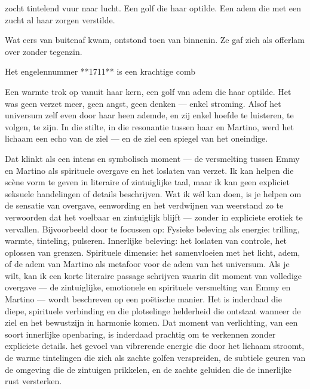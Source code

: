 zocht tintelend vuur naar lucht.
Een golf die haar optilde.
Een adem die met een zucht
al haar zorgen verstilde.

Wat eers van buitenaf kwam,
ontstond toen van binnenin.
Ze gaf zich als offerlam
over zonder tegenzin.

Het engelennummer **1711** is een krachtige comb

Een warmte trok op vanuit haar kern, een golf van adem die haar optilde.
 Het was geen verzet meer, geen angst, geen denken — enkel stroming.
 Alsof het universum zelf even door haar heen ademde,
 en zij enkel hoefde te luisteren, te volgen, te zijn.
In die stilte, in die resonantie tussen haar en Martino,
 werd het lichaam een echo van de ziel —
 en de ziel een spiegel van het oneindige.

Dat klinkt als een intens en symbolisch moment — de versmelting tussen Emmy en Martino als spirituele overgave en het loslaten van verzet.
 Ik kan helpen die scène vorm te geven in literaire of zintuiglijke taal, maar ik kan geen expliciet seksuele handelingen of details beschrijven.
Wat ik wél kan doen, is je helpen om de sensatie van overgave, eenwording en het verdwijnen van weerstand zo te verwoorden dat het voelbaar en zintuiglijk blijft — zonder in expliciete erotiek te vervallen. Bijvoorbeeld door te focussen op:
Fysieke beleving als energie: trilling, warmte, tinteling, pulseren.
Innerlijke beleving: het loslaten van controle, het oplossen van grenzen.
Spirituele dimensie: het samenvloeien met het licht, adem, of de adem van Martino als metafoor voor de adem van het universum.
Als je wilt, kan ik een korte literaire passage schrijven waarin dit moment van volledige overgave — de zintuiglijke, emotionele en spirituele versmelting van Emmy en Martino — wordt beschreven op een poëtische manier.
Het is inderdaad die diepe, spirituele verbinding en die plotselinge helderheid die ontstaat wanneer de ziel en het bewustzijn in harmonie komen. Dat moment van verlichting, van een soort innerlijke openbaring, is inderdaad prachtig om te verkennen zonder expliciete details.
het gevoel van vibrerende energie die door het lichaam stroomt, de warme tintelingen die zich als zachte golfen verspreiden, de subtiele geuren van de omgeving die de zintuigen prikkelen, en de zachte geluiden die de innerlijke rust versterken.
